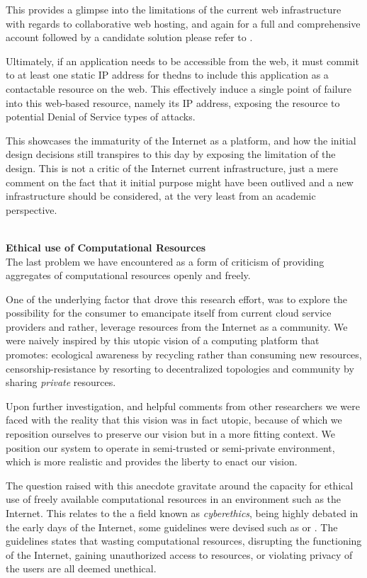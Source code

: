 \documentclass[12pt, titlepage]{uo_temp}
\begin{document}
     This provides a glimpse into the limitations of the current web infrastructure with
     regards to collaborative web hosting, and again for a full and comprehensive account
     followed by a candidate solution please refer to \cite{ahmed2014collaborative}.

     Ultimately, if an application needs to be accessible from the web, it must commit to
     at least one static IP address for the\gls{dns} to include this application as a
     contactable resource on the web. This effectively induce a single point of failure
     into this web-based resource, namely its IP address, exposing the resource to
     potential Denial of Service types of attacks.

     This showcases the immaturity of the Internet as a platform, and how the initial design decisions
     still transpires to this day by exposing the limitation of the design. This is not a
     critic of the Internet current infrastructure, just a mere comment on the fact that it
     initial purpose might have been outlived and a new infrastructure should be
     considered, at the very least from an academic perspective.

     \\ \textbf{Ethical use of Computational Resources}
     \\ The last problem we have encountered as a form of criticism of providing
     aggregates of computational resources openly and freely. 

     One of the underlying factor that drove this research effort, was to explore the
     possibility for the consumer to emancipate itself from current cloud service
     providers and rather, leverage resources from the Internet as a community.
     We were naively inspired by this utopic vision of a computing platform that promotes:
     ecological awareness by recycling rather than consuming new resources,
     censorship-resistance by resorting to decentralized topologies and community by
     sharing \emph{private} resources.
     
     Upon further investigation, and helpful comments from other researchers we were faced
     with the reality that this vision was in fact utopic, because of which we reposition
     ourselves to preserve our vision but in a more fitting context. We position
     our system to operate in semi-trusted or semi-private environment, which is more
     realistic and provides the liberty to enact our vision. 
     
     The question raised with this anecdote gravitate around the capacity for ethical use
     of freely available computational resources in an environment such as the
     Internet. This relates to the a field known as \emph{cyberethics}, being highly
     debated in the early days of the Internet, some guidelines were devised such as
     \cite{ethics1989rfc} or \cite{barquin1992pursuit}. The guidelines states that wasting
     computational resources, disrupting the functioning of the Internet, gaining
     unauthorized access to resources, or violating privacy of the users are all deemed
     unethical.
\end{document}
